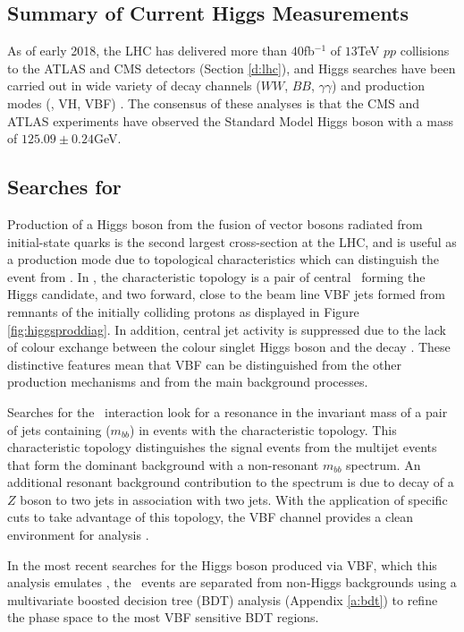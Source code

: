 	\subsection{Summary of Current Higgs Measurements}

		As of early 2018, the LHC has delivered more than $40$fb$^{-1}$ of $13$TeV $pp$ collisions to the ATLAS and CMS detectors (Section \ref{d:lhc}), and Higgs searches have been carried out in wide variety of decay channels ($WW$, $BB$, $\gamma\gamma$) and production modes (\ggF, VH, VBF) \cite{pdghiggs, VBFHbb8tev, searchvh, tth}. The consensus of these analyses is that the CMS and ATLAS experiments have observed the Standard Model Higgs boson with a mass of $125.09\pm0.24$GeV\cite{pdg}.

	\subsection{Searches for \VBFHBB}
		\label{t:VBF}

		Production of a Higgs boson from the fusion of vector bosons radiated from initial-state quarks is the second largest cross-section at the LHC, and is useful as a production mode due to topological characteristics which can distinguish the event from \ggF. In \VBFHBB, the characteristic topology is a pair of central \bjets\ forming the Higgs candidate, and two forward, close to the beam line VBF jets formed from remnants of the initially colliding protons as displayed in Figure \ref{fig:higgsproddiag}. In addition, central jet activity is suppressed due to the lack of colour exchange between the colour singlet Higgs boson and the decay \bquarks\cite{VBF2004}.  These distinctive features mean that VBF can be distinguished from the other production mechanisms and from the main background processes.

		Searches for the \VBFHBB\, interaction look for a resonance in the invariant mass of a pair of jets containing \bquarks ($m_{bb}$) in events with the characteristic topology. This characteristic topology distinguishes the signal events from the multijet events that form the dominant background with a non-resonant $m_{bb}$ spectrum. An additional resonant background contribution to the \mbb spectrum is due to decay of a $Z$ boson to two jets in association with two jets. With the application of specific cuts to take advantage of this topology, the VBF channel provides a clean environment for analysis \cite{pdghiggs}.

		In the most recent searches for the Higgs boson produced via VBF, which this analysis emulates \cite{VBFHbb8tev}, the \VBFHBB\, events are separated from non-Higgs backgrounds using a multivariate boosted decision tree (BDT) analysis (Appendix \ref{a:bdt}) to refine the phase space to the most VBF sensitive BDT regions.


\endinput
